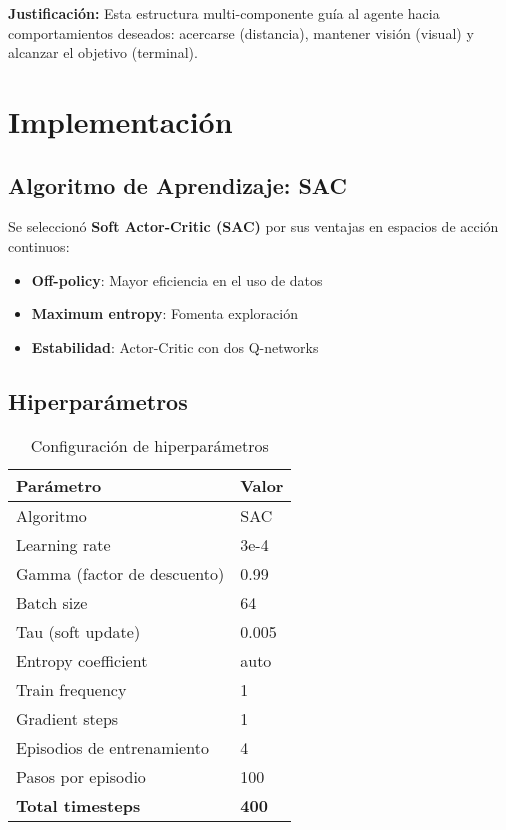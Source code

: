 \documentclass[12pt,a4paper]{article}
\begin{document}
\textbf{Justificación:} Esta estructura multi-componente guía al agente hacia comportamientos deseados: acercarse (distancia), mantener visión (visual) y alcanzar el objetivo (terminal).

\section{Implementación}

\subsection{Algoritmo de Aprendizaje: SAC}

Se seleccionó \textbf{Soft Actor-Critic (SAC)} por sus ventajas en espacios de acción continuos:

\begin{itemize}
    \item \textbf{Off-policy}: Mayor eficiencia en el uso de datos
    \item \textbf{Maximum entropy}: Fomenta exploración
    \item \textbf{Estabilidad}: Actor-Critic con dos Q-networks
\end{itemize}

\subsection{Hiperparámetros}

\begin{table}[H]
\centering
\begin{tabular}{@{}ll@{}}
\toprule
\textbf{Parámetro} & \textbf{Valor} \\ \midrule
Algoritmo & SAC \\
Learning rate & 3e-4 \\
Gamma (factor de descuento) & 0.99 \\
Batch size & 64 \\
Tau (soft update) & 0.005 \\
Entropy coefficient & auto \\
Train frequency & 1 \\
Gradient steps & 1 \\
Episodios de entrenamiento & 4 \\
Pasos por episodio & 100 \\
\textbf{Total timesteps} & \textbf{400} \\ \bottomrule
\end{tabular}
\caption{Configuración de hiperparámetros}
\end{table}
\end{document}
